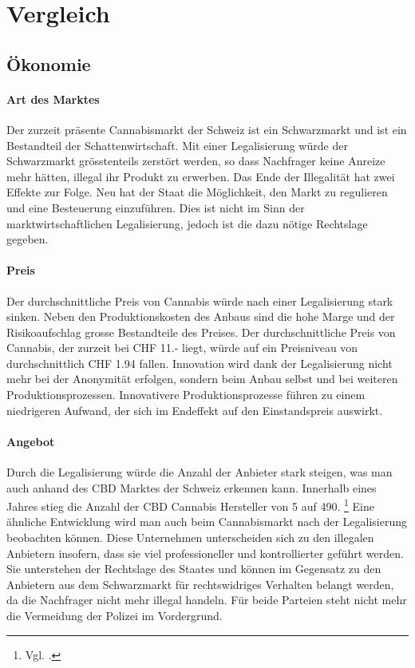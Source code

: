 \documentclass[../main.tex]{subfiles}
\begin{document}
	
	\section{Vergleich}
	
	\subsection{Ökonomie}
	
	\paragraph{Art des Marktes}
	Der zurzeit präsente Cannabismarkt der Schweiz ist ein Schwarzmarkt und ist ein Bestandteil der Schattenwirtschaft.
	Mit einer Legalisierung würde der Schwarzmarkt grösstenteils zerstört werden, so dass Nachfrager keine Anreize mehr hätten, illegal ihr Produkt zu erwerben.
	Das Ende der Illegalität hat zwei Effekte zur Folge. 
	Neu hat der Staat die Möglichkeit, den Markt zu regulieren und eine Besteuerung einzuführen.
	Dies ist nicht im Sinn der marktwirtschaftlichen Legalisierung, jedoch ist die dazu nötige Rechtslage gegeben.
	
	\paragraph{Preis}
	Der durchschnittliche Preis von Cannabis würde nach einer Legalisierung stark sinken.
	Neben den Produktionskosten des Anbaus sind die hohe Marge und der Risikoaufschlag grosse Bestandteile des Preises.
	Der durchschnittliche Preis von Cannabis, der zurzeit bei CHF 11.- liegt, würde auf ein Preisniveau von durchschnittlich CHF 1.94 fallen.
	Innovation wird dank der Legalisierung nicht mehr bei der Anonymität erfolgen, sondern beim Anbau selbst und bei weiteren Produktionsprozessen. 
	Innovativere Produktionsprozesse führen zu einem niedrigeren Aufwand, der sich im Endeffekt auf den Einstandspreis auswirkt.
	
	\paragraph{Angebot}
	Durch die Legalisierung würde die Anzahl der Anbieter stark steigen, was man auch anhand des CBD Marktes der Schweiz erkennen kann.
	Innerhalb eines Jahres stieg die Anzahl der CBD Cannabis Hersteller von 5 auf 490.%
	\footnote{Vgl. \cite{nzz-01}.}	
	Eine ähnliche Entwicklung wird man auch beim Cannabismarkt nach der Legalisierung beobachten können.
	Diese Unternehmen unterscheiden sich zu den illegalen Anbietern insofern, dass sie viel professioneller und kontrollierter geführt werden.
	Sie unterstehen der Rechtslage des Staates und können im Gegensatz zu den Anbietern aus dem Schwarzmarkt für rechtswidriges Verhalten belangt werden, da die Nachfrager nicht mehr illegal handeln.
	Für beide Parteien steht nicht mehr die Vermeidung der Polizei im Vordergrund.
	
\end{document}
